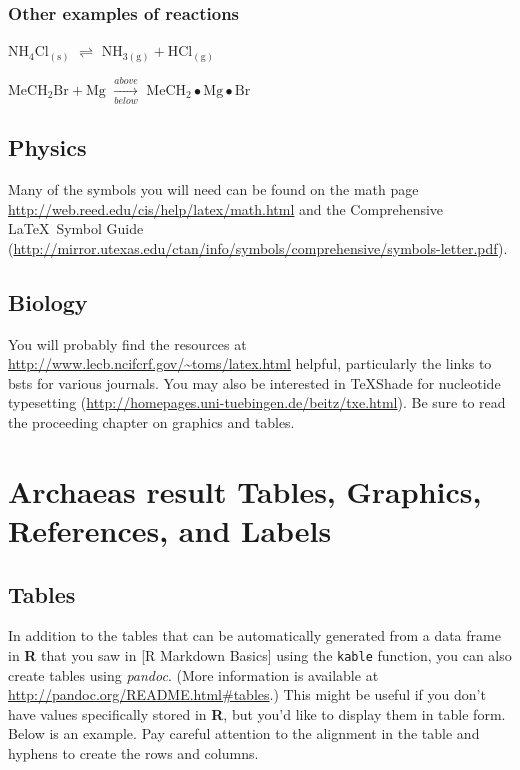 \documentclass[12pt,twoside]{reedthesis}
\begin{document}
  \subsection{Other examples of
  reactions}\label{other-examples-of-reactions}
  
  \(\mathrm{NH_4Cl_{(s)}}\) \(\rightleftharpoons\)
  \(\mathrm{NH_{3(g)}+HCl_{(g)}}\)
  
  \noindent \(\mathrm{MeCH_2Br + Mg}\) \(\xrightarrow[below]{above}\)
  \(\mathrm{MeCH_2\bullet Mg \bullet Br}\)
  
  \section{Physics}\label{physics}
  
  Many of the symbols you will need can be found on the math page
  \url{http://web.reed.edu/cis/help/latex/math.html} and the Comprehensive
  \LaTeX~Symbol Guide
  (\url{http://mirror.utexas.edu/ctan/info/symbols/comprehensive/symbols-letter.pdf}).
  
  \section{Biology}\label{biology}
  
  You will probably find the resources at
  \url{http://www.lecb.ncifcrf.gov/~toms/latex.html} helpful, particularly
  the links to bsts for various journals. You may also be interested in
  TeXShade for nucleotide typesetting
  (\url{http://homepages.uni-tuebingen.de/beitz/txe.html}). Be sure to
  read the proceeding chapter on graphics and tables.
  
  \hypertarget{ref_labels}{\chapter{Archaeas result Tables, Graphics,
  References, and Labels}\label{ref_labels}}
  
  \section{Tables}\label{tables}
  
  In addition to the tables that can be automatically generated from a
  data frame in \textbf{R} that you saw in {[}R Markdown Basics{]} using
  the \texttt{kable} function, you can also create tables using
  \emph{pandoc}. (More information is available at
  \url{http://pandoc.org/README.html\#tables}.) This might be useful if
  you don't have values specifically stored in \textbf{R}, but you'd like
  to display them in table form. Below is an example. Pay careful
  attention to the alignment in the table and hyphens to create the rows
  and columns.
  
\end{document}
